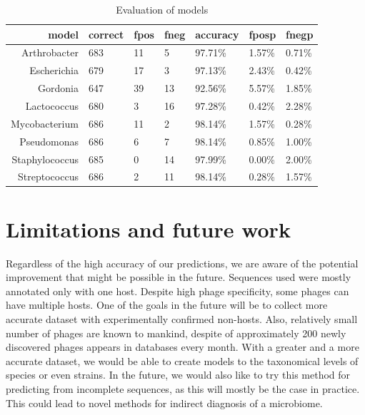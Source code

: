 \begin{table}
  \centering
    \begin{tabular}{ r l l l l l l }
	\hline
	model & correct & fpos & fneg & accuracy & fposp & fnegp \\
	\hline
	Arthrobacter & 683 & 11 & 5  & 97.71\% & 1.57\% & 0.71\% \\
	Escherichia & 679 & 17 & 3  & 97.13\% & 2.43\% & 0.42\% \\
	Gordonia & 647 & 39 & 13 & 92.56\% & 5.57\% & 1.85\% \\
	Lactococcus & 680 & 3  & 16 & 97.28\% & 0.42\% & 2.28\% \\
	Mycobacterium & 686 & 11 & 2  & 98.14\% & 1.57\% & 0.28\% \\
	Pseudomonas & 686 & 6  & 7  & 98.14\% & 0.85\% & 1.00\% \\
	Staphylococcus & 685 & 0  & 14 & 97.99\% & 0.00\% & 2.00\% \\
	Streptococcus & 686 & 2  & 11 & 98.14\% & 0.28\% & 1.57\% \\
	\end{tabular}
	\bigskip
    \caption{Evaluation of models}
    \label{tab:models}
\end{table}

\section{Limitations and future work}
Regardless of the high accuracy of our predictions, we are aware of the potential improvement that might be possible in the future.
Sequences used were mostly annotated only with one host.
Despite high phage specificity, some phages can have multiple hosts.
One of the goals in the future will be to collect more accurate dataset with experimentally confirmed non-hosts.
Also, relatively small number of phages are known to mankind, despite of approximately 200 newly discovered phages appears in databases every month.
With a greater and a more accurate dataset, we would be able to create models to the taxonomical levels of species or even strains.
In the future, we would also like to try this method for predicting from incomplete sequences, as this will mostly be  the case in practice.
This could lead to novel methods for indirect diagnosis of a microbiome.

